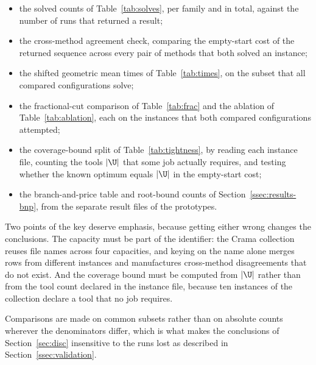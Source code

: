 \begin{itemize}[topsep=3pt,itemsep=1pt]
  \item the solved counts of Table~\ref{tab:solves}, per family and in total, against
  the number of runs that returned a result;
  \item the cross-method agreement check, comparing the empty-start cost of the
  returned sequence across every pair of methods that both solved an instance;
  \item the shifted geometric mean times of Table~\ref{tab:times}, on the subset that
  all compared configurations solve;
  \item the fractional-cut comparison of Table~\ref{tab:frac} and the ablation of
  Table~\ref{tab:ablation}, each on the instances that both compared configurations
  attempted;
  \item the coverage-bound split of Table~\ref{tab:tightness}, by reading each instance
  file, counting the tools $\lvert\U\rvert$ that some job actually requires, and testing
  whether the known optimum equals $\lvert\U\rvert$ in the empty-start cost;
  \item the branch-and-price table and root-bound counts of
  Section~\ref{ssec:results-bnp}, from the separate result files of the prototypes.
\end{itemize}

Two points of the key deserve emphasis, because getting either wrong changes the
conclusions. The capacity must be part of the identifier: the Crama collection reuses
file names across four capacities, and keying on the name alone merges rows from
different instances and manufactures cross-method disagreements that do not exist. And
the coverage bound must be computed from $\lvert\U\rvert$ rather than from the tool
count declared in the instance file, because ten instances of the collection declare a
tool that no job requires.

Comparisons are made on common subsets rather than on absolute counts wherever the
denominators differ, which is what makes the conclusions of Section~\ref{sec:disc}
insensitive to the runs lost as described in Section~\ref{ssec:validation}.
